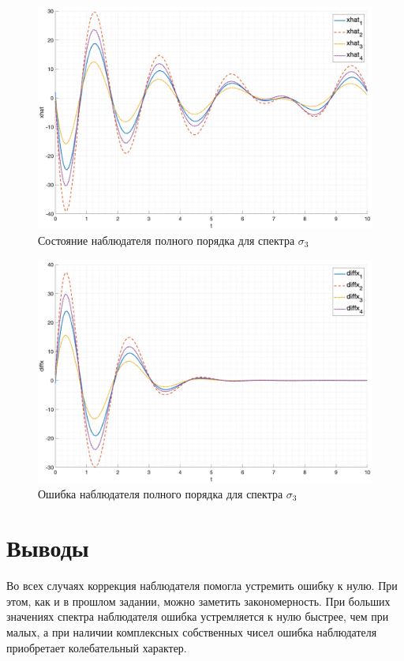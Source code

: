 \begin{figure}[ht!]
    \centering
    \includegraphics[width=\textwidth]{media/plots/task2_xhat_3.png}
    \caption{Состояние наблюдателя полного порядка для спектра $\sigma_3$}
    \label{fig:task2_xhat_3}
\end{figure}

\begin{figure}[ht!]
    \centering
    \includegraphics[width=\textwidth]{media/plots/task2_diffx_3.png}
    \caption{Ошибка наблюдателя полного порядка для спектра $\sigma_3$}
    \label{fig:task2_diff_3}
\end{figure}

\FloatBarrier
\section{Выводы}
Во всех случаях коррекция наблюдателя помогла устремить ошибку к нулю. При этом, как и в прошлом задании, 
можно заметить закономерность. При больших значениях спектра наблюдателя ошибка устремляется к нулю быстрее, чем при малых, 
а при наличии комплексных собственных чисел ошибка наблюдателя приобретает колебательный характер.